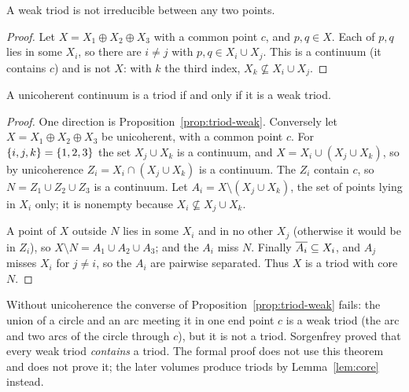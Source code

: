 \begin{lemma}\label{lem:weak-not-irr}
A weak triod is not irreducible between any two points.
\end{lemma}

\begin{proof}
Let $X=X_1\oplus X_2\oplus X_3$ with a common point $c$, and $p,q\in X$. Each of $p,q$ lies in some
$X_i$, so there are $i\neq j$ with $p,q\in X_i\cup X_j$. This is a continuum (it contains $c$) and is
not $X$: with $k$ the third index, $X_k\not\subseteq X_i\cup X_j$.
\end{proof}


\begin{proposition}\label{prop:uni-triod}
A unicoherent continuum is a triod if and only if it is a weak triod.
\end{proposition}

\begin{proof}
One direction is Proposition~\ref{prop:triod-weak}. Conversely let $X=X_1\oplus X_2\oplus X_3$ be
unicoherent, with a common point $c$. For $\left\{ i,j,k \right\}=\left\{ 1,2,3 \right\}$ the set $X_j\cup X_k$ is a
continuum, and $X=X_i\cup(X_j\cup X_k)$, so by unicoherence $Z_i=X_i\cap(X_j\cup X_k)$ is a continuum.
The $Z_i$ contain $c$, so $N=Z_1\cup Z_2\cup Z_3$ is a continuum. Let $A_i=X\setminus(X_j\cup X_k)$,
the set of points lying in $X_i$ only; it is nonempty because $X_i\not\subseteq X_j\cup X_k$.

A point of $X$ outside $N$ lies in some $X_i$ and in no other $X_j$ (otherwise it would be in $Z_i$),
so $X\setminus N=A_1\cup A_2\cup A_3$; and the $A_i$ miss $N$. Finally $\overline{A_i}\subseteq X_i$, and $A_j$
misses $X_i$ for $j\ne i$, so the $A_i$ are pairwise separated. Thus $X$ is a triod with core $N$.
\end{proof}


\begin{remark}
Without unicoherence the converse of Proposition~\ref{prop:triod-weak} fails: the union of a circle
and an arc meeting it in one end point $c$ is a weak triod (the arc and two arcs of the circle
through $c$), but it is not a triod. Sorgenfrey proved that every weak triod \emph{contains} a
triod. The formal proof does not use this theorem and does not prove it; the
later volumes produce triods by Lemma~\ref{lem:core} instead.
\end{remark}

